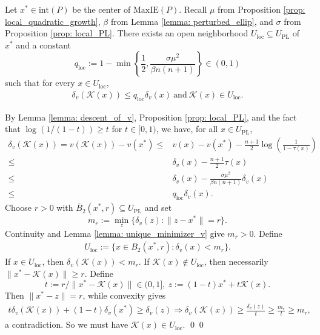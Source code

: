 \documentclass[smallextended]{svjour3}
\let\springerproof\proof
\let\endspringerproof\endproof
\renewenvironment{proof}{\springerproof}{%
  \ifhmode\qed\else\leavevmode\qed\fi\endspringerproof}
\newcommand{\K}{\mathcal{K}}
\newcommand{\MaxIE}{\mathrm{MaxIE}}
\begin{document}
\begin{proposition}\label{prop: local_contraction}
    Let $x^*\in \mathrm{int}(P)$ be the center of $\MaxIE(P)$. Recall $\mu$ from Proposition \ref{prop: local_quadratic_growth}, $\beta$ from Lemma \ref{lemma: perturbed_ellip}, and $\sigma$ from Proposition \ref{prop: local_PL}.
    There exists an open neighborhood $U_{\mathrm{loc}} \subseteq U_{\mathrm{PL}}$ of $x^*$ and a constant
    $$q_{\mathrm{loc}} := 1 - \min \left\{\frac{1}{2}, \frac{\sigma \mu^2}{\beta n(n+1)} \right\} \in (0, 1)$$
    such that for every $x \in U_{\mathrm{loc}}$,
    \begin{align*}
        \delta_v(\K(x)) \leq q_{\mathrm{loc}} \delta_v(x)~\text{and}~ \K(x) \in U_{\mathrm{loc}}.
    \end{align*}
\end{proposition}
\begin{proof}
    By Lemma \ref{lemma: descent_of_v}, Proposition \ref{prop: local_PL}, and the fact that $\log(1/(1-t))\geq t$ for $t\in[0,1)$, we have, for all $x\in U_{\mathrm{PL}}$,
    \begin{align*}
        \delta_v(\K(x)) = v(\K(x)) -v(x^*) \leq  & v(x) -v(x^*) - \frac{n+1}{2}\log\left(\frac{1}{1-\tau(x)}\right) \\
        \leq & \delta_v(x) -\frac{n+1}{2}\tau(x) \\
        \leq & \delta_v(x) - \frac{\sigma \mu^2}{\beta n(n+1)} \delta_v(x) \\
        \leq & q_{\mathrm{loc}}\delta_v(x).
    \end{align*}
    Choose $r>0$ with $\bar{B}_2(x^*,r)\subseteq U_{\mathrm{PL}}$ and set
    $$m_r := \min_{z} \{\delta_v(z): \|z-x^*\| = r\}. $$
    Continuity and Lemma \ref{lemma: unique_minimizer_v} give $m_r>0$. Define
    \begin{align*}
        U_\mathrm{loc} := \{x \in {B}_2(x^*, r): \delta_v(x) < m_r\}.
    \end{align*}
    If $x\in U_\mathrm{loc}$, then $\delta_v(\K(x))<m_r$. If
    $\K(x) \notin U_\mathrm{loc}$, then necessarily
    $\|x^*-\K(x)\|\geq r$. Define
    $$t := r/\|x^*-\K(x)\|\in (0, 1],~ z :=(1-t)x^* +t \K(x).$$
    Then $\|x^*-z\|=r$, while convexity gives
    \begin{align*}
        t\delta_v(\K(x)) + (1-t) \delta_v(x^*) \geq \delta_v(z)
        \Rightarrow  \delta_v(\K(x)) \geq \frac{\delta_v(z)}{t} \geq \frac{m_r}{t} \geq m_r,
    \end{align*}
    a contradiction. So we must have $\K(x)\in U_{\mathrm{loc}}$.
\end{proof}
\end{document}
